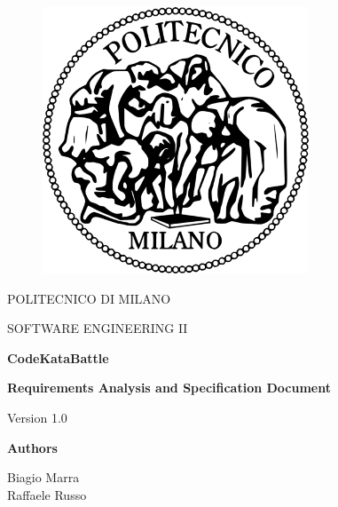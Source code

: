 \begin{figure}[t]
    \centering
    \includegraphics[scale=0.6]{images/logoPOLIMI.png} 
\end{figure}

\begin{center}
\huge
POLITECNICO DI MILANO
\end{center}

\vspace{1em}



\begin{center}
\large
SOFTWARE ENGINEERING II
\end{center}

\vspace{1em}

\hline

\begin{center}
\LARGE
\textbf{CodeKataBattle}

\vspace{0.3\baselineskip}

\textbf{Requirements Analysis and Specification Document}

\vspace{0.3\baselineskip}

\normalsize
Version 1.0

\end{center}

\hline

\vspace{12\baselineskip}

\begin{center}
\Large
    \textbf{Authors} 
    
    \vspace{0.2\baselineskip}

    \large
    Biagio Marra
    \\
    Raffaele Russo 
\end{center}